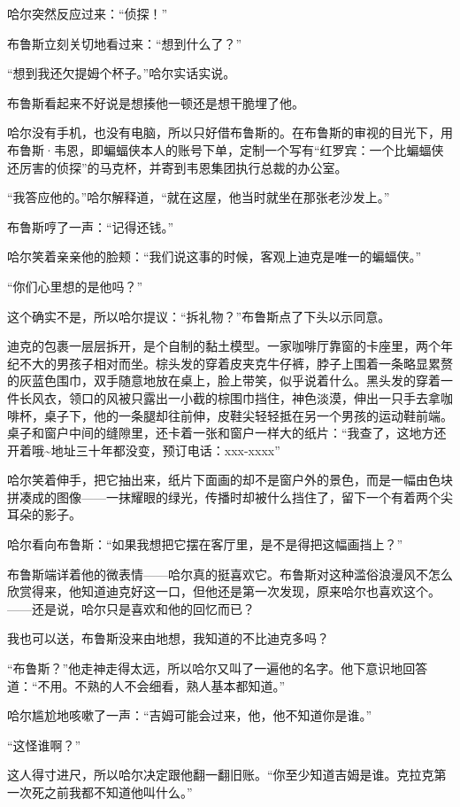 \documentclass[../main]{subfiles}
\begin{document}
哈尔突然反应过来：“侦探！”

布鲁斯立刻关切地看过来：“想到什么了？”

“想到我还欠提姆个杯子。”哈尔实话实说。

布鲁斯看起来不好说是想揍他一顿还是想干脆埋了他。

哈尔没有手机，也没有电脑，所以只好借布鲁斯的。在布鲁斯的审视的目光下，用布鲁斯·韦恩，即蝙蝠侠本人的账号下单，定制一个写有“红罗宾：一个比蝙蝠侠还厉害的侦探”的马克杯，并寄到韦恩集团执行总裁的办公室。

“我答应他的。”哈尔解释道，“就在这屋，他当时就坐在那张老沙发上。”

布鲁斯哼了一声：“记得还钱。”

哈尔笑着亲亲他的脸颊：“我们说这事的时候，客观上迪克是唯一的蝙蝠侠。”

“你们心里想的是他吗？”

这个确实不是，所以哈尔提议：“拆礼物？”布鲁斯点了下头以示同意。

迪克的包裹一层层拆开，是个自制的黏土模型。一家咖啡厅靠窗的卡座里，两个年纪不大的男孩子相对而坐。棕头发的穿着皮夹克牛仔裤，脖子上围着一条略显累赘的灰蓝色围巾，双手随意地放在桌上，脸上带笑，似乎说着什么。黑头发的穿着一件长风衣，领口的风被只露出一小截的棕围巾挡住，神色淡漠，伸出一只手去拿咖啡杯，桌子下，他的一条腿却往前伸，皮鞋尖轻轻抵在另一个男孩的运动鞋前端。桌子和窗户中间的缝隙里，还卡着一张和窗户一样大的纸片：“我查了，这地方还开着哦\textasciitilde 地址三十年都没变，预订电话：xxx-xxxx”

哈尔笑着伸手，把它抽出来，纸片下面画的却不是窗户外的景色，而是一幅由色块拼凑成的图像——一抹耀眼的绿光，传播时却被什么挡住了，留下一个有着两个尖耳朵的影子。

哈尔看向布鲁斯：“如果我想把它摆在客厅里，是不是得把这幅画挡上？”

布鲁斯端详着他的微表情——哈尔真的挺喜欢它。布鲁斯对这种滥俗浪漫风不怎么欣赏得来，他知道迪克好这一口，但他还是第一次发现，原来哈尔也喜欢这个。——还是说，哈尔只是喜欢和他的回忆而已？

我也可以送，布鲁斯没来由地想，我知道的不比迪克多吗？

“布鲁斯？”他走神走得太远，所以哈尔又叫了一遍他的名字。他下意识地回答道：“不用。不熟的人不会细看，熟人基本都知道。”

哈尔尴尬地咳嗽了一声：“吉姆可能会过来，他，他不知道你是谁。”

“这怪谁啊？”

这人得寸进尺，所以哈尔决定跟他翻一翻旧账。“你至少知道吉姆是谁。克拉克第一次死之前我都不知道他叫什么。”
\end{document}
